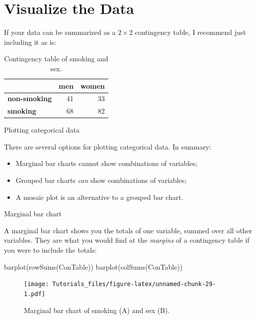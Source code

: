 \documentclass[
]{book}
\newenvironment{Shaded}{\begin{snugshade}}{\end{snugshade}}
\newcommand{\FunctionTok}[1]{\textcolor[rgb]{0.00,0.00,0.00}{#1}}
\newcommand{\NormalTok}[1]{#1}
\providecommand{\tightlist}{%
  \setlength{\itemsep}{0pt}\setlength{\parskip}{0pt}}
\begin{document}
\hypertarget{vis-chi}{%
\section{Visualize the Data}\label{vis-chi}}

If your data can be summarized as a \(2 \times 2\) contingency table, I recommend just including it as is:

\begin{table}

\caption{\label{tab:unnamed-chunk-27}Contingency table of smoking and sex.}
\centering
\begin{tabular}[t]{>{}l|r|r}
\hline
  & men & women\\
\hline
\textbf{non-smoking} & 41 & 33\\
\hline
\textbf{smoking} & 68 & 82\\
\hline
\end{tabular}
\end{table}

Plotting categorical data

There are several options for plotting categorical data. In summary:

\begin{itemize}
\tightlist
\item
  Marginal bar charts cannot show combinations of variables;
\item
  Grouped bar charts \emph{can} show combinations of variables;
\item
  A mosaic plot is an alternative to a grouped bar chart.
\end{itemize}

Marginal bar chart

A marginal bar chart shows you the totals of one variable, summed over all other variables. They are what you would find at the \emph{margins} of a contingency table if you were to include the totals:

\begin{Shaded}
\begin{Highlighting}[]
\FunctionTok{barplot}\NormalTok{(}\FunctionTok{rowSums}\NormalTok{(ConTable))}
\FunctionTok{barplot}\NormalTok{(}\FunctionTok{colSums}\NormalTok{(ConTable))}
\end{Highlighting}
\end{Shaded}

\begin{figure}
\centering
\texttt{[image: Tutorials\_files/figure-latex/unnamed-chunk-29-1.pdf]}
\caption{\label{fig:unnamed-chunk-29}Marginal bar chart of smoking (A) and sex (B).}
\end{figure}
\end{document}
